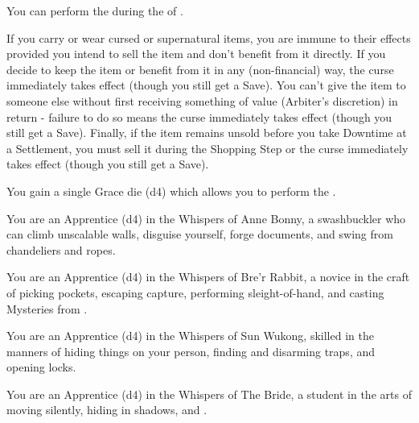 \begin{multicols*}{2}

    You can perform the  during the  of .



    If you carry or wear cursed or supernatural items, you are immune to their effects provided you intend to sell the item and don't benefit from it directly. If you decide to keep the item or benefit from it in any (non-financial) way, the curse immediately takes effect (though you still get a Save). You can’t give the item to someone else without first receiving something of value (Arbiter's discretion) in return - failure to do so means the curse immediately takes effect (though you still get a Save). Finally, if the item remains unsold before you take Downtime at a Settlement, you must sell it during the Shopping Step or the curse immediately takes effect (though you still get a Save).

   
    You gain a single Grace die (d4) which allows you to perform the .


    You are an Apprentice (d4) in the Whispers of Anne Bonny, a swashbuckler who can climb unscalable walls, disguise yourself, forge documents, and swing from chandeliers and ropes.


    You are an Apprentice (d4) in the Whispers of Bre'r Rabbit, a novice in the craft of picking pockets, escaping capture, performing sleight-of-hand, and casting Mysteries from .



    You are an Apprentice (d4) in the Whispers of Sun Wukong, skilled in the manners of hiding things on your person, finding and disarming traps, and opening locks.

\cbreak


    You are an Apprentice (d4) in the Whispers of The Bride, a student in the arts of moving silently, hiding in shadows, and .



\end{multicols*}

